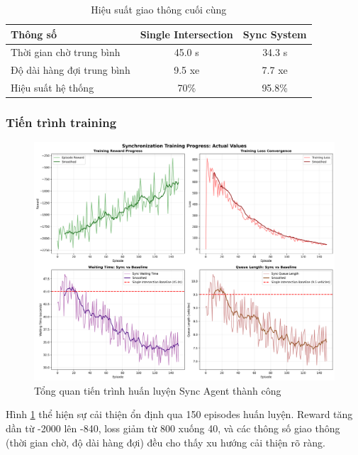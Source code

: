 \begin{table}[!htp]
    \centering
    \caption{Hiệu suất giao thông cuối cùng}
    \label{tab:sync_final_performance}
    \begin{tabular}{@{}lcc@{}}
        \toprule \textbf{Thông số} & \textbf{Single Intersection} & \textbf{Sync System} \\
        \midrule 
        Thời gian chờ trung bình & 45.0 s & 34.3 s \\
        Độ dài hàng đợi trung bình & 9.5 xe & 7.7 xe \\
        Hiệu suất hệ thống & 70\% & 95.8\% \\
        \bottomrule
    \end{tabular}
\end{table}

\subsubsection{Tiến trình training}

\begin{figure}[!htp]
    \centering
    \includegraphics[width=\textwidth]{figures/training_overview.png}
    \caption{Tổng quan tiến trình huấn luyện Sync Agent thành công}
    \label{fig:sync_training_overview}
\end{figure}

Hình \ref{fig:sync_training_overview} thể hiện sự cải thiện ổn định qua 150 episodes
huấn luyện. Reward tăng dần từ -2000 lên -840, loss giảm từ 800 xuống 40, và các
thông số giao thông (thời gian chờ, độ dài hàng đợi) đều cho thấy xu hướng cải thiện rõ ràng.

